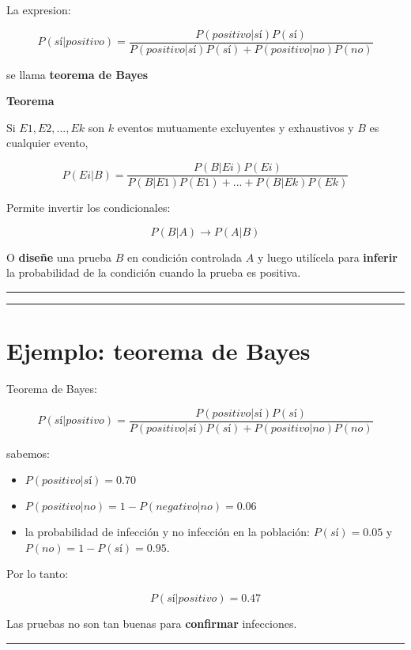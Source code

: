 \documentclass[
]{book}
\begin{document}
La expresion:

\[P(sí|positivo)=\frac{P(positivo|sí)P(sí)}{P(positivo|sí)P(sí)+P(positivo|no)P(no)}\]

se llama \textbf{teorema de Bayes}

\textbf{Teorema}

Si \(E1, E2, ..., Ek\) son \(k\) eventos mutuamente excluyentes y exhaustivos y \(B\) es cualquier evento,

\[P(Ei|B)=\frac{P(B|Ei)P(Ei)}{P(B|E1)P(E1) +...+ P(B|Ek)P(Ek)} \]

Permite invertir los condicionales:

\[P(B|A) \rightarrow P(A|B)\]

O \textbf{diseñe} una prueba \(B\) en condición controlada \(A\) y luego utilícela para \textbf{inferir} la probabilidad de la condición cuando la prueba es positiva.

\begin{center}\rule{0.5\linewidth}{0.5pt}\end{center}

\begin{center}\rule{0.5\linewidth}{0.5pt}\end{center}

\hypertarget{ejemplo-teorema-de-bayes}{%
\section{Ejemplo: teorema de Bayes}\label{ejemplo-teorema-de-bayes}}

Teorema de Bayes:

\[P(sí|positivo) = \frac{P(positivo|sí) P(sí)}{P(positivo|sí)P(sí)+P(positivo|no)P(no)}\]

sabemos:

\begin{itemize}
\item
  \(P(positivo|sí)=0.70\)
\item
  \(P(positivo|no)=1- P(negativo|no)=0.06\)
\item
  la probabilidad de infección y no infección en la población: \(P(sí)=0.05\) y \(P(no)=1-P(sí)=0.95\).
\end{itemize}

Por lo tanto:

\[P(sí|positivo)=0.47\]

Las pruebas no son tan buenas para \textbf{confirmar} infecciones.

\begin{center}\rule{0.5\linewidth}{0.5pt}\end{center}
\end{document}
